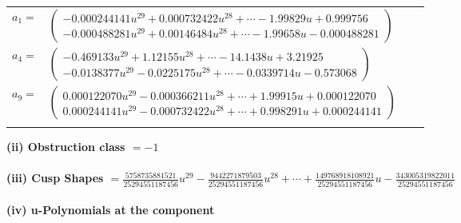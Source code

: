 \documentclass[1p]{elsarticle_modified}
\theoremstyle{definition}
\begin{document}
\begin{tabular}{m{7pt} m{180pt} m{7pt} m{180pt} }
\flushright $a_{1}=$&$\begin{pmatrix}-0.000244141 u^{29}+0.000732422 u^{28}+\cdots-1.99829 u+0.999756\\-0.000488281 u^{29}+0.00146484 u^{28}+\cdots-1.99658 u-0.000488281\end{pmatrix}$ \\
\flushright $a_{4}=$&$\begin{pmatrix}-0.469133 u^{29}+1.12155 u^{28}+\cdots-14.1438 u+3.21925\\-0.0138377 u^{29}-0.0225175 u^{28}+\cdots-0.0339714 u-0.573068\end{pmatrix}$ \\
\flushright $a_{9}=$&$\begin{pmatrix}0.000122070 u^{29}-0.000366211 u^{28}+\cdots+1.99915 u+0.000122070\\0.000244141 u^{29}-0.000732422 u^{28}+\cdots+0.998291 u+0.000244141\end{pmatrix}$\\&\end{tabular}
\flushleft \textbf{(ii) Obstruction class $= -1$}\\~\\
\flushleft \textbf{(iii) Cusp Shapes $= \frac{5758735881521}{25294551187456} u^{29}-\frac{9442271879503}{25294551187456} u^{28}+\cdots+\frac{149768918108921}{25294551187456} u-\frac{343005319822011}{25294551187456}$}\\~\\
\newpage\renewcommand{\arraystretch}{1}
\flushleft \textbf{(iv) u-Polynomials at the component}\newline \\
\end{document}
